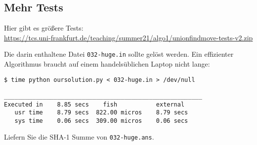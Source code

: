 \documentclass{uebung_cs}
\begin{document}
  \subsection*{Mehr Tests}
  Hier gibt es größere Tests:\\
  \small\url{https://tcs.uni-frankfurt.de/teaching/summer21/algo1/unionfindmove-tests-v2.zip}

  Die darin enthaltene Datei \verb|032-huge.in| sollte gelöst werden.
  Ein effizienter Algorithmus braucht auf einem handelsüblichen Laptop nicht lange:
  \begin{verbatim}
$ time python oursolution.py < 032-huge.in > /dev/null

________________________________________________________
Executed in    8.85 secs    fish           external
   usr time    8.79 secs  822.00 micros    8.79 secs
   sys time    0.06 secs  309.00 micros    0.06 secs
  \end{verbatim}
  Liefern Sie die SHA-1 Summe von \verb|032-huge.ans|.
\end{document}
